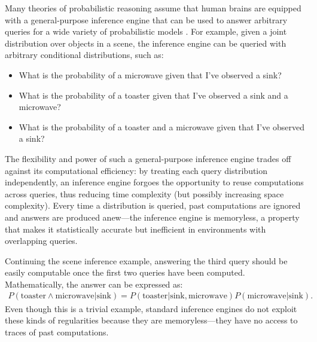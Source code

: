 Many theories of probabilistic reasoning assume that human brains are equipped with a general-purpose inference engine that can be used to answer arbitrary queries for a wide variety of probabilistic models \citep{griffiths2012bridging, oaksford2007bayesian}. For example, given a joint distribution over objects in a scene, the inference engine can be queried with arbitrary conditional distributions, such as:
\begin{itemize}
\item What is the probability of a microwave given that I've observed a sink?
\item What is the probability of a toaster given that I've observed a sink and a microwave?
\item What is the probability of a toaster and a microwave given that I've observed a sink?
\end{itemize}


The flexibility and power of such a general-purpose inference engine trades off against its computational efficiency: by treating each query distribution independently, an inference engine forgoes the opportunity to reuse computations across queries, thus reducing time complexity (but possibly increasing space complexity). Every time a distribution is queried, past computations are ignored and answers are produced anew---the inference engine is memoryless, a property that makes it statistically accurate but inefficient in environments with overlapping queries.

Continuing the scene inference example, answering the third query should be easily computable once the first two queries have been computed. Mathematically, the answer can be expressed as:
\begin{align}
P(\text{toaster} \wedge \text{microwave}|\text{sink}) = P(\text{toaster}|\text{sink},\text{microwave}) P(\text{microwave}|\text{sink}).
\end{align}
Even though this is a trivial example, standard inference engines do not exploit these kinds of regularities because they are memoryless---they have no access to traces of past computations.

